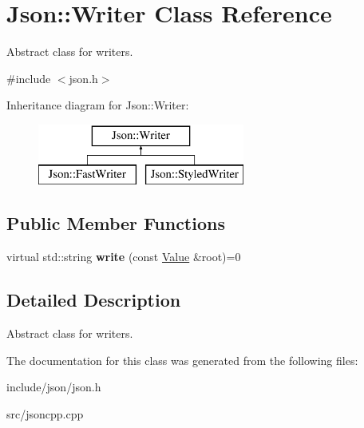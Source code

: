 \hypertarget{class_json_1_1_writer}{\section{Json\-:\-:Writer Class Reference}
\label{class_json_1_1_writer}
}


Abstract class for writers.  




{\ttfamily \#include $<$json.\-h$>$}

Inheritance diagram for Json\-:\-:Writer\-:\begin{figure}[H]
\begin{center}
\leavevmode
\includegraphics[height=2.000000cm]{class_json_1_1_writer}
\end{center}
\end{figure}
\subsection*{Public Member Functions}
\begin{DoxyCompactItemize}
\item 
\hypertarget{class_json_1_1_writer_a7b2273a4ffd6f32b369ac8a53b7b5a0d}{virtual std\-::string {\bfseries write} (const \hyperlink{class_json_1_1_value}{Value} \&root)=0}\label{class_json_1_1_writer_a7b2273a4ffd6f32b369ac8a53b7b5a0d}

\end{DoxyCompactItemize}


\subsection{Detailed Description}
Abstract class for writers. 

The documentation for this class was generated from the following files\-:\begin{DoxyCompactItemize}
\item 
include/json/json.\-h\item 
src/jsoncpp.\-cpp\end{DoxyCompactItemize}
